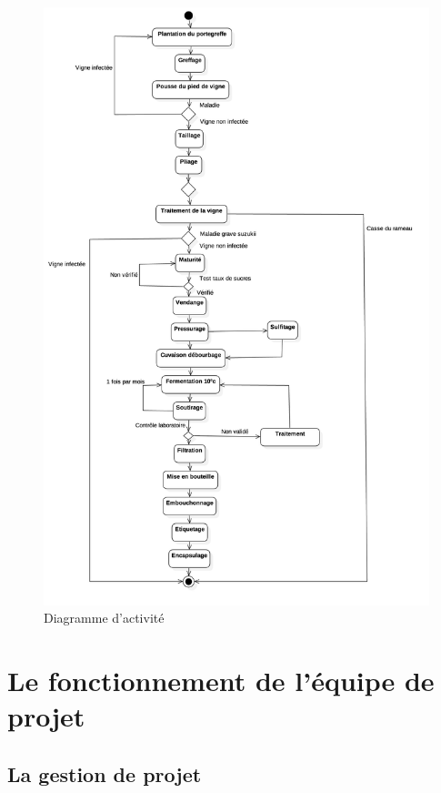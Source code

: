 \documentclass[a4paper, titlepage]{report}
\begin{document}
\clearpage
\begin{figure}[!h]
\centering
\includegraphics{Images/DiagrammeActivite.jpg}
\caption{Diagramme d'activité}
\end{figure}

\clearpage
\section{Le fonctionnement de l'équipe de
projet}\label{le-fonctionnement-de-lequipe-de-projet}

\subsection{La gestion de projet}\label{la-gestion-de-projet}
\end{document}
